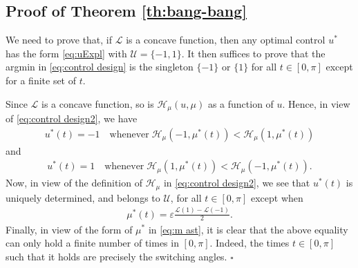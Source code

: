 \documentclass[twocolumn]{autart}    %
\begin{document}
\subsection{Proof of Theorem \ref{th:bang-bang}}\label{proof:bang-bang}

We need to prove that, if $\mathcal{L}$ is a concave function, then any optimal control $u^\ast$ has the form \eqref{eq:uExpl} with $\mathcal{U}=\{-1,1\}$. It then suffices to prove that the argmin in \eqref{eq:control design} is the singleton $\{-1\}$ or $\{1\}$ for all $t\in [0,\pi]$ except for a finite set of $t$.

Since $\mathcal{L}$ is a concave function, so is $\mathcal{H}_\mu(u,\mu)$ as a function of $u$. Hence, in view of \eqref{eq:control design2}, we have
\begin{align*} 
	u^\ast (t)= -1  \quad \text{whenever} \; \mathcal{H}_\mu(-1,\mu^\ast(t)) <  \mathcal{H}_\mu(1,\mu^\ast(t)) 
\end{align*} 
and
\begin{align*}
	u^\ast (t)= 1  \quad \text{whenever} \; \mathcal{H}_\mu(1,\mu^\ast(t)) <  \mathcal{H}_\mu(-1,\mu^\ast(t)) .
\end{align*}
Now, in view of the definition of $\mathcal{H}_\mu$ in \eqref{eq:control design2}, we see that $u^\ast(t)$ is uniquely determined, and belongs to $\mathcal{U}$, for all $t\in [0,\pi]$ except when
\begin{align*}
	\mu^\ast (t) = \varepsilon \frac{\mathcal{L}(1) - \mathcal{L}(-1)}{2}.
\end{align*}
Finally, in view of the form of $\mu^\ast$ in \eqref{eq:m ast}, it is clear that the above equality can only hold a finite number of times in $[0,\pi]$. Indeed, the times $t\in [0,\pi]$ such that it holds are precisely the switching angles. \hfill $\square$
\end{document}
